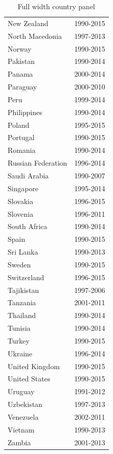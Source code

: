 \documentclass[12pt,a4paper]{article}
\begin{document}
\begin{table}[htbp]
\begin{subtable}{0.45\textwidth}
\begin{tabular}{ll}
               New Zealand &  1990-2015 \\
           North Macedonia &  1997-2013 \\
                    Norway &  1990-2015 \\
                  Pakistan &  1990-2014 \\
                    Panama &  2000-2014 \\
                  Paraguay &  2000-2010 \\
                      Peru &  1999-2014 \\
               Philippines &  1990-2014 \\
                    Poland &  1995-2015 \\
                  Portugal &  1990-2015 \\
                   Romania &  1990-2014 \\
        Russian Federation &  1996-2014 \\
              Saudi Arabia &  1990-2007 \\
                 Singapore &  1995-2014 \\
                  Slovakia &  1996-2015 \\
                  Slovenia &  1996-2011 \\
              South Africa &  1990-2014 \\
                     Spain &  1990-2015 \\
                 Sri Lanka &  1990-2013 \\
                    Sweden &  1990-2015 \\
               Switzerland &  1996-2015 \\
                Tajikistan &  1997-2006 \\
                  Tanzania &  2001-2011 \\
                  Thailand &  1990-2014 \\
                   Tunisia &  1990-2014 \\
                    Turkey &  1990-2015 \\
                   Ukraine &  1996-2014 \\
            United Kingdom &  1990-2015 \\
             United States &  1990-2015 \\
                   Uruguay &  1991-2012 \\
                Uzbekistan &  1997-2013 \\
                 Venezuela &  2002-2011 \\
                   Vietnam &  1990-2013 \\
                    Zambia &  2001-2013 \\
\bottomrule
\end{tabular}
\end{subtable}
\caption{Full width country panel}
\label{tab:all_countries}
\end{table}
\end{document}
